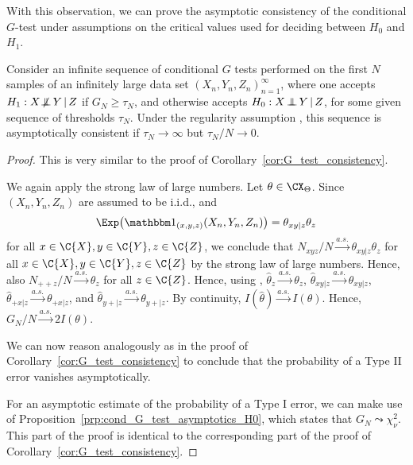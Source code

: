 With this observation, we can prove the asymptotic consistency of the conditional $G$-test under assumptions on the critical values used
for deciding between $H_0$ and $H_1$.
\begin{Cor}\label{cor:cond_G_test_consistency}
Consider an infinite sequence of conditional $G$ tests performed on the first $N$ samples of an infinitely large
data set $(X_n,Y_n,Z_n)_{n=1}^\infty$,
where one accepts $H_1 : X \operatorname*{\not\mkern-2mu\perp\mkern-11mu\perp} Y \operatorname*{|} Z$ if $G_N \ge \tau_N$, and otherwise accepts $H_0 : X \operatorname*{\perp\mkern-11mu\perp} Y \operatorname*{|} Z$, 
for some given sequence of thresholds $\tau_N$.
Under the regularity assumption , this sequence is
asymptotically consistent if $\tau_N \to \infty$ but $\tau_N / N \to 0$.
\end{Cor}
\begin{proof}
This is very similar to the proof of Corollary~\ref{cor:G_test_consistency}.
  
We again apply the strong law of large numbers.
Let $\theta \in \CX_\Theta$. Since $(X_n,Y_n,Z_n)$ are assumed to be i.i.d., and 
  $$\Exp \big(\I_{(x,y,z)}(X_n,Y_n,Z_n)\big) = \theta_{xy|z}\theta_z$$
for all $x \in \C{X}, y \in \C{Y}, z \in \C{Z}$,
we conclude that $N_{xyz} / N \stackrel{a.s.}{\to} \theta_{xy|z} \theta_z$ for all $x \in \C{X}, y \in \C{Y}, z\in \C{Z}$
by the strong law of large numbers. Hence, also $N_{+ + z} / N \stackrel{a.s.}{\to} \theta_z$ for all $z \in \C{Z}$.
Hence, using ,
$\hat\theta_z \stackrel{a.s.}{\to} \theta_z$,
$\hat\theta_{xy|z} \stackrel{a.s.}{\to} \theta_{xy|z}$,
$\hat\theta_{+ x|z} \stackrel{a.s.}{\to} \theta_{+ x|z}$, and
$\hat\theta_{y +|z} \stackrel{a.s.}{\to} \theta_{y +|z}$.
By continuity, $I(\hat\theta) \stackrel{a.s.}{\to} I(\theta)$.
Hence, $G_N / N \stackrel{a.s.}{\to} 2I(\theta)$. 
  
We can now reason analogously as in the proof of 
Corollary~\ref{cor:G_test_consistency} to conclude that
the probability of a Type II error vanishes asymptotically.

For an asymptotic estimate of the probability of a Type I error,
we can make use of Proposition~\ref{prp:cond_G_test_asymptotics_H0},
which states that $G_N \leadsto \chi_{\nu}^2$. 
This part of the proof is identical to the corresponding part of the proof of Corollary~\ref{cor:G_test_consistency}.
\end{proof}

